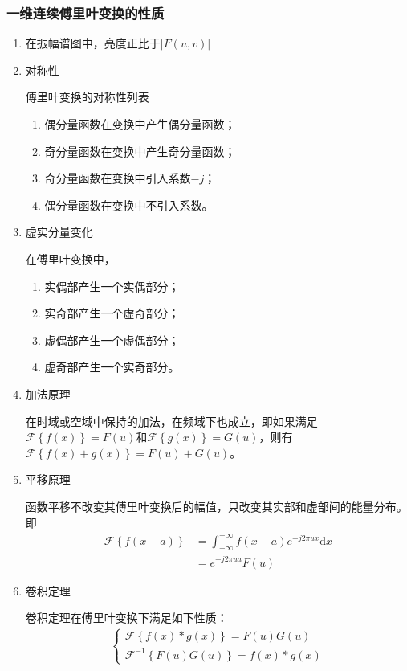 \documentclass{hitreport}
\begin{document}
\subsubsection{一维连续傅里叶变换的性质}
\begin{enumerate}
\item 在振幅谱图中，亮度正比于$\lvert F\left(u,v\right) \rvert$
\item 对称性

傅里叶变换的对称性列表
\begin{enumerate}
\item 偶分量函数在变换中产生偶分量函数；
\item 奇分量函数在变换中产生奇分量函数；
\item 奇分量函数在变换中引入系数$-j$；
\item 偶分量函数在变换中不引入系数。
\end{enumerate}
\item 虚实分量变化

在傅里叶变换中，
\begin{enumerate}
\item 实偶部产生一个实偶部分；
\item 实奇部产生一个虚奇部分；
\item 虚偶部产生一个虚偶部分；
\item 虚奇部产生一个实奇部分。
\end{enumerate}
\item 加法原理

在时域或空域中保持的加法，在频域下也成立，即如果满足$\mathscr{F}\left\{f\left(x\right)\right\} = F\left(u\right)$和$\mathscr{F}\left\{g\left(x\right)\right\} = G\left(u\right)$，则有$\mathscr{F}\left\{f\left(x\right)+g\left(x\right)\right\} = F\left(u\right)+G\left(u\right)$。

\item 平移原理

函数平移不改变其傅里叶变换后的幅值，只改变其实部和虚部间的能量分布。即
\begin{align}
\mathscr{F}\left\{f\left(x-a\right)\right\} &= \int_{-\infty}^{+\infty}{f\left(x-a\right)e^{-j2\pi ux}\mathrm{d} x}\\
&=e^{-j2\pi ua}F\left(u\right)
\end{align}

\item 卷积定理

卷积定理在傅里叶变换下满足如下性质：
\begin{align}
\left\{ \begin{array}{l}
	\mathscr{F}\left\{f\left(x\right)\ast g\left(x\right)\right\} = F\left(u\right)G\left(u\right)\\
	\mathscr{F}^{-1}\left\{F\left(u\right)G\left(u\right)\right\} = f\left(x\right)\ast g\left(x\right)
	\end{array} \right.
\end{align}


\end{enumerate}
\end{document}
